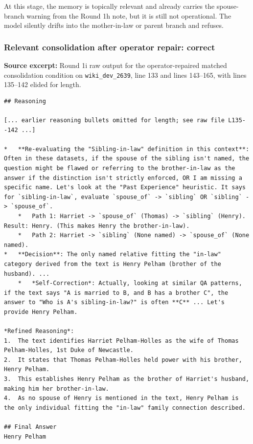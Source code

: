 At this stage, the memory is topically relevant and already carries the spouse-branch warning from the Round 1h note, but it is still not operational. The model silently drifts into the mother-in-law or parent branch and refuses.

\subsubsection{Relevant consolidation after operator repair: correct}

\textbf{Source excerpt:} Round 1i raw output for the operator-repaired matched consolidation condition on \texttt{wiki\_dev\_2639}, line 133 and lines 143--165, with lines 135--142 elided for length.

\begin{lstlisting}
## Reasoning

[... earlier reasoning bullets omitted for length; see raw file L135--142 ...]

*   **Re-evaluating the "Sibling-in-law" definition in this context**: Often in these datasets, if the spouse of the sibling isn't named, the question might be flawed or referring to the brother-in-law as the answer if the distinction isn't strictly enforced, OR I am missing a specific name. Let's look at the "Past Experience" heuristic. It says for `sibling-in-law`, evaluate `spouse_of` -> `sibling` OR `sibling` -> `spouse_of`.
    *   Path 1: Harriet -> `spouse_of` (Thomas) -> `sibling` (Henry). Result: Henry. (This makes Henry the brother-in-law).
    *   Path 2: Harriet -> `sibling` (None named) -> `spouse_of` (None named).
*   **Decision**: The only named relative fitting the "in-law" category derived from the text is Henry Pelham (brother of the husband). ...
    *   *Self-Correction*: Actually, looking at similar QA patterns, if the text says "A is married to B, and B has a brother C", the answer to "Who is A's sibling-in-law?" is often **C** ... Let's provide Henry Pelham.

*Refined Reasoning*:
1.  The text identifies Harriet Pelham-Holles as the wife of Thomas Pelham-Holles, 1st Duke of Newcastle.
2.  It states that Thomas Pelham-Holles held power with his brother, Henry Pelham.
3.  This establishes Henry Pelham as the brother of Harriet's husband, making him her brother-in-law.
4.  As no spouse of Henry is mentioned in the text, Henry Pelham is the only individual fitting the "in-law" family connection described.

## Final Answer
Henry Pelham
\end{lstlisting}

